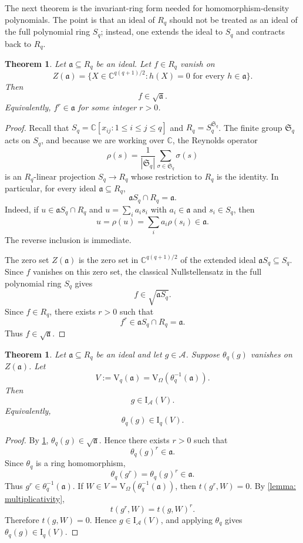 \documentclass[a4paper,12pt]{article}
\newtheorem{theorem}[lemma]{Theorem}
\theoremstyle{definition}
\newcommand\cA{\mathcal{A}}
\newcommand\C{\mathbb{C}}
\newcommand\Sym{\mathfrak{S}}
\newcommand\V{\mathrm{V}_{\Omega}}
\newcommand\Vq{\mathrm{V}_{q}}
\newcommand\Iq{\mathrm{I}_{q}}
\newcommand\IA{\mathrm{I}_{\cA}}
\newcommand\Rq{R_q}
\newcommand\Sq{S_q}
\newcommand\thetaq{\theta_q}
\begin{document}
The next theorem is the invariant-ring form needed for homomorphism-density polynomials. The point is that an ideal of $\Rq$ should not be treated as an ideal of the full polynomial ring $\Sq$; instead, one extends the ideal to $\Sq$ and contracts back to $\Rq$.

\begin{theorem}\label{HNAK1}
Let $\mathfrak a\subseteq\Rq$ be an ideal. Let $f\in\Rq$ vanish on
\[
    Z(\mathfrak a)=\{X\in\C^{q(q+1)/2}:h(X)=0\text{ for every }h\in\mathfrak a\}.
\]
Then
\[
    f\in\sqrt{\mathfrak a}.
\]
Equivalently, $f^r\in\mathfrak a$ for some integer $r>0$.
\end{theorem}

\begin{proof}
Recall that $\Sq=\C[x_{ij}:1\leq i\leq j\leq q]$ and $\Rq=\Sq^{\Sym_q}$. The finite group $\Sym_q$ acts on $\Sq$, and because we are working over $\C$, the Reynolds operator
\[
    \rho(s)=\frac{1}{|\Sym_q|}\sum_{\sigma\in\Sym_q}\sigma(s)
\]
is an $\Rq$-linear projection $\Sq\to\Rq$ whose restriction to $\Rq$ is the identity. In particular, for every ideal $\mathfrak a\subseteq\Rq$,
\[
    \mathfrak a\Sq\cap\Rq=\mathfrak a.
\]
Indeed, if $u\in\mathfrak a\Sq\cap\Rq$ and $u=\sum_i a_i s_i$ with $a_i\in\mathfrak a$ and $s_i\in\Sq$, then
\[
    u=\rho(u)=\sum_i a_i\rho(s_i)\in\mathfrak a.
\]
The reverse inclusion is immediate.

The zero set $Z(\mathfrak a)$ is the zero set in $\C^{q(q+1)/2}$ of the extended ideal $\mathfrak a\Sq\subseteq\Sq$. Since $f$ vanishes on this zero set, the classical Nullstellensatz in the full polynomial ring $\Sq$ gives
\[
    f\in\sqrt{\mathfrak a\Sq}.
\]
Since $f\in\Rq$, there exists $r>0$ such that
\[
    f^r\in\mathfrak a\Sq\cap\Rq=\mathfrak a.
\]
Thus $f\in\sqrt{\mathfrak a}$.
\end{proof}

\begin{theorem}\label{HNAK2}
Let $\mathfrak a\subseteq\Rq$ be an ideal and let $g\in\cA$. Suppose $\thetaq(g)$ vanishes on $Z(\mathfrak a)$. Let
\[
    V:=\Vq(\mathfrak a)=\V(\thetaq^{-1}(\mathfrak a)).
\]
Then
\[
    g\in\IA(V).
\]
Equivalently,
\[
    \thetaq(g)\in\Iq(V).
\]
\end{theorem}

\begin{proof}
By \cref{HNAK1}, $\thetaq(g)\in\sqrt{\mathfrak a}$. Hence there exists $r>0$ such that
\[
    \thetaq(g)^r\in\mathfrak a.
\]
Since $\thetaq$ is a ring homomorphism,
\[
    \thetaq(g^r)=\thetaq(g)^r\in\mathfrak a.
\]
Thus $g^r\in\thetaq^{-1}(\mathfrak a)$. If $W\in V=\V(\thetaq^{-1}(\mathfrak a))$, then $t(g^r,W)=0$. By \cref{lemma: multiplicativity},
\[
    t(g^r,W)=t(g,W)^r.
\]
Therefore $t(g,W)=0$. Hence $g\in\IA(V)$, and applying $\thetaq$ gives $\thetaq(g)\in\Iq(V)$.
\end{proof}
\end{document}
